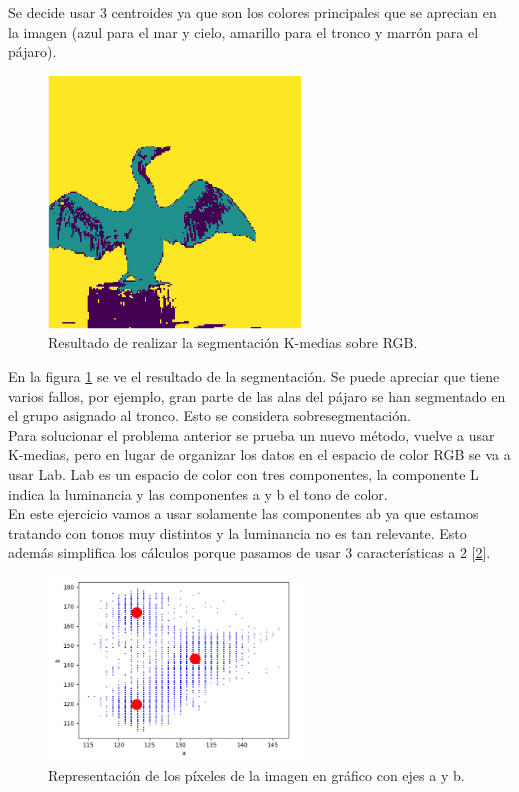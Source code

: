 \documentclass[a4paper,12pt]{report}
\begin{document}
 Se decide usar 3 centroides ya que son los colores principales que se aprecian en la imagen (azul para el mar y cielo, amarillo para el tronco y marrón para el pájaro).\\

\begin{figure}[h]
\centering
\includegraphics[width=0.6\textwidth]{imagenes/segmentacionrgb}
\caption{Resultado de realizar la segmentación K-medias sobre RGB.}
\label{segmentacionrgb}
\end{figure}

En la figura \ref{segmentacionrgb} se ve el resultado de la segmentación. Se puede apreciar que tiene varios fallos, por ejemplo, gran parte de las alas del pájaro se han segmentado en el grupo asignado al tronco. Esto se considera sobresegmentación.\\

Para solucionar el problema anterior se prueba un nuevo método, vuelve a usar K-medias, pero en lugar  de organizar los datos en el espacio de color RGB se va a usar Lab. Lab es un espacio de color con tres componentes, la componente L indica la luminancia y las componentes a y b el tono de color.\\

En este ejercicio vamos a usar solamente las componentes ab ya que estamos tratando con tonos muy distintos y la luminancia no es tan relevante. Esto además simplifica los cálculos porque pasamos de usar 3 características a 2 [\ref{cormoranlab}].\\

\begin{figure}[h]
\centering
\includegraphics[width=0.6\textwidth]{imagenes/cormoranlab}
\caption{Representación de los píxeles de la imagen en gráfico con ejes a y b.}
\label{cormoranlab}
\end{figure}
\end{document}
